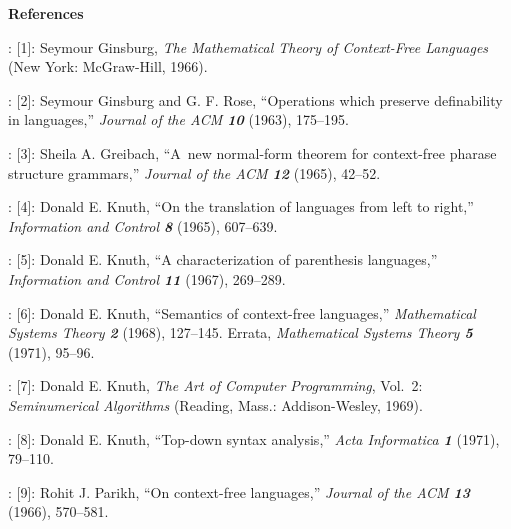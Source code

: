 \bigskip
\centerline{\bf References}
\bigskip
{}:
[1]:
Seymour Ginsburg, {\sl The Mathematical Theory of Context-Free
Languages\/} (New York: Mc\-Graw-Hill, 1966).

\medskip
{}:
[2]:
Seymour Ginsburg and G. F. Rose,
``Operations which preserve definability in languages,''
{\sl Journal of the ACM\/ \bf 10} (1963), 175--195.

\medskip{}:
[3]:
Sheila A. Greibach, 
``A~new normal-form theorem for context-free pharase structure
grammars,''
{\sl Journal of the ACM\/ \bf 12} (1965), 42--52.

\medskip{}:
[4]:
Donald E. Knuth,
``On the translation of languages from left to right,''
{\sl Information and Control\/ \bf 8} (1965), 607--639.

\medskip{}:
[5]:
Donald E. Knuth,
``A characterization of parenthesis languages,''
  {\sl Information and Control\/ \bf 11} (1967), 269--289.  

\medskip{}:
[6]:
Donald E. Knuth,
``Semantics of context-free languages,''  {\sl Mathematical
 Systems Theory\/ \bf 2} (1968), 127--145.  Errata, 
{\sl Mathematical Systems Theory\/ \bf 5} (1971), 95--96.  

\medskip{}:
[7]:
Donald E. Knuth,
{\sl The Art of Computer Programming}, Vol.~2: {\sl Seminumerical Algorithms}
(Reading, Mass.: Addison-Wesley, 1969).

\medskip{}:
[8]:
Donald E. Knuth,
``Top-down syntax analysis,''  {\sl Acta Informatica\/ \bf 1}
 (1971), 79--110. 

\medskip{}:
[9]:
Rohit J. Parikh,
``On context-free languages,''
{\sl Journal of the ACM\/ \bf 13} (1966), 570--581.

\bye
